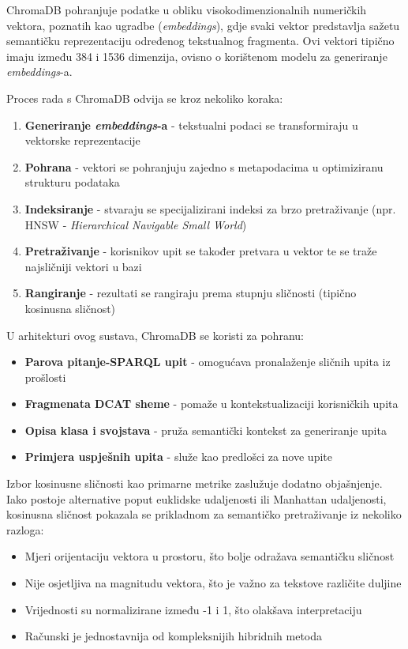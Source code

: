ChromaDB pohranjuje podatke u obliku visokodimenzionalnih numeričkih vektora, poznatih kao ugradbe (\textit{embeddings}), gdje svaki vektor predstavlja sažetu semantičku reprezentaciju određenog tekstualnog fragmenta. Ovi vektori tipično imaju između 384 i 1536 dimenzija, ovisno o korištenom modelu za generiranje \textit{embeddings}-a.

Proces rada s ChromaDB odvija se kroz nekoliko koraka:

\begin{enumerate}
    \item \textbf{Generiranje \textit{embeddings}-a} - tekstualni podaci se transformiraju u vektorske reprezentacije
    \item \textbf{Pohrana} - vektori se pohranjuju zajedno s metapodacima u optimiziranu strukturu podataka
    \item \textbf{Indeksiranje} - stvaraju se specijalizirani indeksi za brzo pretraživanje (npr. HNSW - \textit{Hierarchical Navigable Small World})
    \item \textbf{Pretraživanje} - korisnikov upit se također pretvara u vektor te se traže najsličniji vektori u bazi
    \item \textbf{Rangiranje} - rezultati se rangiraju prema stupnju sličnosti (tipično kosinusna sličnost)
\end{enumerate}

U arhitekturi ovog sustava, ChromaDB se koristi za pohranu:

\begin{itemize}
    \item \textbf{Parova pitanje-SPARQL upit} - omogućava pronalaženje sličnih upita iz prošlosti
    \item \textbf{Fragmenata DCAT sheme} - pomaže u kontekstualizaciji korisničkih upita
    \item \textbf{Opisa klasa i svojstava} - pruža semantički kontekst za generiranje upita
    \item \textbf{Primjera uspješnih upita} - služe kao predlošci za nove upite
\end{itemize}

Izbor kosinusne sličnosti kao primarne metrike zaslužuje dodatno objašnjenje. Iako postoje alternative poput euklidske udaljenosti ili Manhattan udaljenosti, kosinusna sličnost pokazala se prikladnom za semantičko pretraživanje iz nekoliko razloga:

\begin{itemize}
    \item Mjeri orijentaciju vektora u prostoru, što bolje odražava semantičku sličnost
    \item Nije osjetljiva na magnitudu vektora, što je važno za tekstove različite duljine
    \item Vrijednosti su normalizirane između -1 i 1, što olakšava interpretaciju
    \item Računski je jednostavnija od kompleksnijih hibridnih metoda
\end{itemize}

